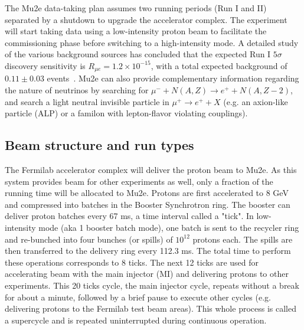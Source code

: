 The Mu2e data-taking plan assumes two running periods (Run I and II) separated by a shutdown to upgrade the accelerator complex. The experiment will start taking data using a low-intensity proton beam to facilitate the commissioning phase before switching to a high-intensity mode. A detailed study of the various background sources has concluded that the expected Run I $5\sigma$ discovery sensitivity is $R_{\mu e} =  1.2 \times 10^{-15}$, with a total expected background of $0.11 \pm 0.03$ events~\cite{Mu2e:2022ggl}. Mu2e can also provide complementary information regarding the nature of neutrinos by searching for $\mu^- + N(A,Z) \rightarrow e^+ + N(A,Z-2)$, and search a light neutral invisible particle in $\mu^+ \rightarrow e^+ + X$ (e.g. an axion-like particle (ALP) or a familon with lepton-flavor violating couplings).

\subsection {Beam structure and run types}
The Fermilab accelerator complex will deliver the proton beam to Mu2e. As this system provides beam for other experiments as well, only a fraction of the running time will be allocated to Mu2e. Protons are first accelerated to 8 GeV and compressed into batches in the Booster Synchrotron ring. The booster can deliver proton batches every 67 ms, a time interval called a "tick". In low-intensity mode (aka 1 booster batch mode), one batch is sent to the recycler ring and re-bunched into four bunches (or spills) of $10^{12}$ protons each. The spills are then transferred to the delivery ring every 112.3 ms. The total time to perform these operations corresponds to 8 ticks. The next 12 ticks are used for accelerating beam with the main injector (MI) and delivering protons to other experiments. This 20 ticks cycle, the main injector cycle, repeats without a break for about a minute, followed by a brief pause to execute other cycles (e.g. delivering protons to the Fermilab test beam areas). This whole process is called a supercycle and is repeated uninterrupted during continuous operation. 

